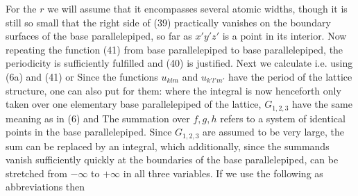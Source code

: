 \begin{paper}{1}
For the  $r$ we will assume that it encompasses several atomic widths, though it is still so small that the right side of (39) practically vanishes on the boundary surfaces of the base parallelepiped, so far as $x'y'z'$ is a point in its interior. Now repeating the function (41) from base parallelepiped to base parallelepiped, the periodicity is sufficiently fulfilled and (40) is justified. Next we calculate
i.e. using (6a) and (41)
or
Since the functions $u_{klm}$ and $u_{k'l'm'}$ have the period of the lattice structure, one can also put for them:
where the integral is now henceforth only taken over one elementary base parallelepiped of the lattice, $G_{1,2,3}$ have the same meaning as in (6) and 
The summation over $f,g,h$ refers to a system of identical points in the base parallelepiped. Since $G_{1,2,3}$ are assumed to be very large, the sum can be replaced by an integral, which additionally, since the summands vanish sufficiently quickly at the boundaries of the base parallelepiped, can be stretched from $-\infty$ to $+\infty$ in all three variables. If we use the following as abbreviations
then
\end{paper}

